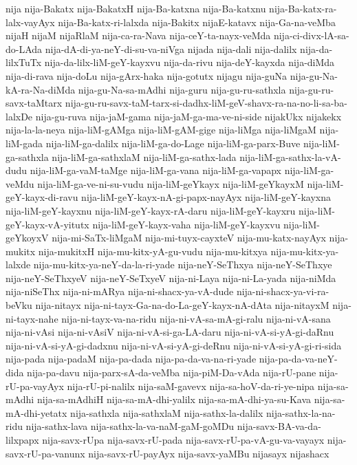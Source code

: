 {nija
nija-Bakatx
nija-BakatxH
nija-Ba-katxna
nija-Ba-katxnu
nija-Ba-katx-ra-lalx-vayAyx
nija-Ba-katx-ri-lalxda
nija-Bakitx
nijaE-katavx
nija-Ga-na-veMba
nijaH
nijaM
nijaRlaM
nija-ca-ra-Nava
nija-ceY-ta-nayx-veMda
nija-ci-divx-lA-sa-do-LAda
nija-dA-di-ya-neY-di-su-va-niVga
nijada
nija-dali
nija-dalilx
nija-da-lilxTuTx
nija-da-lilx-liM-geY-kayxvu
nija-da-rivu
nija-deY-kayxda
nija-diMda
nija-di-rava
nija-doLu
nija-gArx-haka
nija-gotutx
nijagu
nija-guNa
nija-gu-Na-kA-ra-Na-diMda
nija-gu-Na-sa-mAdhi
nija-guru
nija-gu-ru-sathxla
nija-gu-ru-savx-taMtarx
nija-gu-ru-savx-taM-tarx-si-dadhx-liM-geV-shavx-ra-na-no-li-sa-ba-lalxDe
nija-gu-ruva
nija-jaM-gama
nija-jaM-ga-ma-ve-ni-side
nijakUkx
nijakekx
nija-la-la-neya
nija-liM-gAMga
nija-liM-gAM-gige
nija-liMga
nija-liMgaM
nija-liM-gada
nija-liM-ga-dalilx
nija-liM-ga-do-Lage
nija-liM-ga-parx-Buve
nija-liM-ga-sathxla
nija-liM-ga-sathxlaM
nija-liM-ga-sathx-lada
nija-liM-ga-sathx-la-vA-dudu
nija-liM-ga-vaM-taMge
nija-liM-ga-vana
nija-liM-ga-vapapx
nija-liM-ga-veMdu
nija-liM-ga-ve-ni-su-vudu
nija-liM-geYkayx
nija-liM-geYkayxM
nija-liM-geY-kayx-di-ravu
nija-liM-geY-kayx-nA-gi-papx-nayAyx
nija-liM-geY-kayxna
nija-liM-geY-kayxnu
nija-liM-geY-kayx-rA-daru
nija-liM-geY-kayxru
nija-liM-geY-kayx-vA-yitutx
nija-liM-geY-kayx-vaha
nija-liM-geY-kayxvu
nija-liM-geYkoyxV
nija-mi-SaTx-liMgaM
nija-mi-tuyx-cayxteV
nija-mu-katx-nayAyx
nija-mukitx
nija-mukitxH
nija-mu-kitx-yA-gu-vudu
nija-mu-kitxya
nija-mu-kitx-ya-lalxde
nija-mu-kitx-ya-neY-da-la-ri-yade
nija-neY-SeThxya
nija-neY-SeThxye
nija-neY-SeThxyeV
nija-neY-SeTxyeV
nija-ni-Laya
nija-ni-La-yada
nija-niMda
nija-niSeThx
nija-ni-mARya
nija-ni-shacx-ya-vA-dude
nija-ni-shacx-ya-vi-ra-beVku
nija-nitayx
nija-ni-tayx-Ga-na-do-La-geY-kayx-nA-dAta
nija-nitayxM
nija-ni-tayx-nahe
nija-ni-tayx-va-na-ridu
nija-ni-vA-sa-mA-gi-ralu
nija-ni-vA-sana
nija-ni-vAsi
nija-ni-vAsiV
nija-ni-vA-si-ga-LA-daru
nija-ni-vA-si-yA-gi-daRnu
nija-ni-vA-si-yA-gi-dadxnu
nija-ni-vA-si-yA-gi-deRnu
nija-ni-vA-si-yA-gi-ri-sida
nija-pada
nija-padaM
nija-pa-dada
nija-pa-da-va-na-ri-yade
nija-pa-da-va-neY-dida
nija-pa-davu
nija-parx-sA-da-veMba
nija-piM-Da-vAda
nija-rU-pane
nija-rU-pa-vayAyx
nija-rU-pi-nalilx
nija-saM-gavevx
nija-sa-hoV-da-ri-ye-nipa
nija-sa-mAdhi
nija-sa-mAdhiH
nija-sa-mA-dhi-yalilx
nija-sa-mA-dhi-ya-su-Kava
nija-sa-mA-dhi-yetatx
nija-sathxla
nija-sathxlaM
nija-sathx-la-dalilx
nija-sathx-la-na-ridu
nija-sathx-lava
nija-sathx-la-va-naM-gaM-goMDu
nija-savx-BA-va-da-lilxpapx
nija-savx-rUpa
nija-savx-rU-pada
nija-savx-rU-pa-vA-gu-va-vayayx
nija-savx-rU-pa-vanunx
nija-savx-rU-payAyx
nija-savx-yaMBu
nijasayx
nijashacx
}
